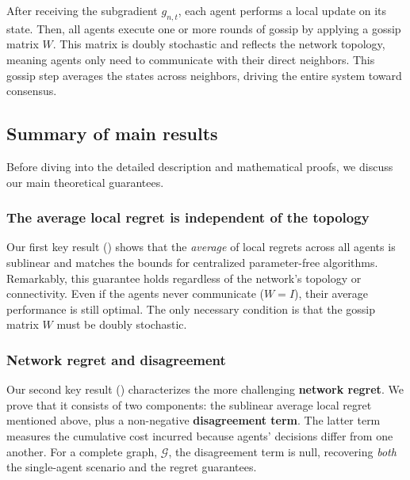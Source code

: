 \documentclass[journal]{IEEEtran} %
\newcommand{\algname}{{DECO}\xspace}
\begin{document}
After receiving the subgradient $g_{n,t}$, each agent performs a local update on its state.
Then, all agents execute one or more rounds of gossip by applying a gossip matrix $W$.
This matrix is doubly stochastic and reflects the network topology, meaning agents only need to communicate with their direct neighbors.
This gossip step averages the states across neighbors, driving the entire system toward consensus.

\begin{algorithm}[t]
    \caption{Decentralized Coin-Betting (\algname{}), variants (\colorbox{red!30}{}) and (\colorbox{green!30}{})}\label{alg:decentralized-coin-betting}
    
\end{algorithm}

\subsection{Summary of main results}
Before diving into the detailed description and mathematical proofs, we discuss our main theoretical guarantees.
\subsubsection{The average local regret is independent of the topology}
Our first key result () shows that the \emph{average} of local regrets across all agents is sublinear and matches the bounds for centralized parameter-free algorithms.
Remarkably, this guarantee holds regardless of the network's topology or connectivity.
Even if the agents never communicate ($W=I$), their average performance is still optimal.
The only necessary condition is that the gossip matrix $W$ must be doubly stochastic.

\subsubsection{Network regret and disagreement}
Our second key result () characterizes the more challenging \textbf{network regret}.
We prove that it consists of two components: the sublinear average local regret mentioned above, plus a non-negative \textbf{disagreement term}.
The latter term measures the cumulative cost incurred because agents' decisions differ from one another.
For a complete graph, $\mathcal{G}$, the disagreement term is null, recovering \emph{both} the single-agent scenario and the regret guarantees.
\end{document}
